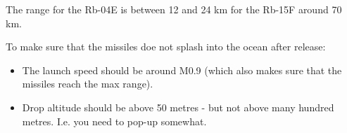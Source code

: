 The range for the Rb-04E is between 12 and 24 km \textasciimacron for the Rb-15F around 70 km.

To make sure that the missiles doe not splash into the ocean after release:
\begin{itemize}
  \item The launch speed should be around M0.9 (which also makes sure that the missiles reach the max range).
  \item Drop altitude should be above 50 metres - but not above many hundred metres. I.e. you need to pop-up somewhat.
\end{itemize}
